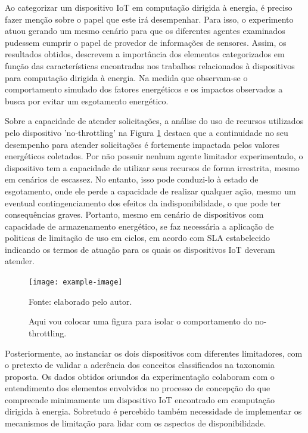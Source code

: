 Ao categorizar um dispositivo \acs{IoT} em computação dirigida à energia, é preciso fazer menção sobre o papel que este irá desempenhar. Para isso, o experimento atuou gerando um mesmo cenário para que os diferentes agentes examinados pudessem cumprir o papel de provedor de informações de sensores. Assim, os resultados obtidos, descrevem a importância dos elementos categorizados em função das características encontradas nos trabalhos relacionados à dispositivos para computação dirigida à energia. Na medida que observam-se o comportamento simulado dos fatores energéticos e os impactos observados a busca por evitar um esgotamento energético.

Sobre a capacidade de atender solicitações, a análise do uso de recursos utilizados pelo dispositivo 'no-throttling' na Figura \ref{fig:cap6nothrottling} destaca que a continuidade no seu desempenho para atender solicitações é fortemente impactada pelos valores energéticos coletados. Por não possuir nenhum agente limitador experimentado, o dispositivo tem a capacidade de utilizar seus recursos de forma irrestrita, mesmo em cenários de escassez. No entanto, isso pode conduzi-lo à estado de esgotamento, onde ele perde a capacidade de realizar qualquer ação, mesmo um eventual contingenciamento dos efeitos da indisponibilidade, o que pode ter consequências graves. Portanto, mesmo em cenário de dispositivos com capacidade de armazenamento energético, se faz necessária a aplicação de politicas de limitação de uso em ciclos, em acordo com \acs{SLA} estabelecido indicando os termos de atuação para os quais os dispositivos \acs{IoT} deveram atender.

\begingroup
\begin{figure}[htb]
	
	\centering
	\caption{Aqui vou colocar uma figura para isolar o comportamento do no-throttling.}
	\label{fig:cap6nothrottling}
	\noindent\texttt{[image: example-image]} 
	
	Fonte: elaborado pelo autor.
\end{figure}
\endgroup


Posteriormente, ao instanciar os dois dispositivos com diferentes limitadores, com o pretexto de validar a aderência dos conceitos classificados na taxonomia proposta. Os dados obtidos oriundos da experimentação colaboram com o entendimento dos elementos envolvidos no processo de concepção do que compreende minimamente um dispositivo \acs{IoT} encontrado em computação dirigida à energia. Sobretudo é percebido também necessidade de implementar os mecanismos de limitação para lidar com os aspectos de disponibilidade.

